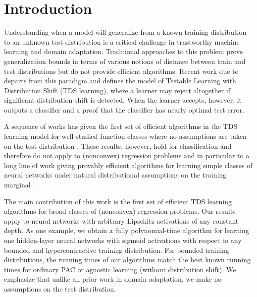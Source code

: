 \documentclass[11pt]{article} %
\numberwithin{equation}{section}
\begin{document}
\newpage
\section{Introduction}

Understanding when a model will generalize from a known training distribution to an unknown test distribution is a critical challenge in trustworthy machine learning and domain adaptation.  Traditional approaches to this problem prove generalization bounds in terms of various notions of distance between train and test distributions \cite{ben2006analysis,ben2010theory,mansour2009domadapt} but do not provide efficient algorithms.  Recent work due to \cite{klivans2023testable} departs from this paradigm and defines the model of Testable Learning with Distribution Shift (TDS learning), where a learner may reject altogether if significant distribution shift is detected.  When the learner accepts, however, it outputs a classifier and a proof that the classifier has nearly optimal test error.   

A sequence of works has given the first set of efficient algorithms in the TDS learning model for well-studied function classes where no assumptions are taken on the test distribution \cite{klivans2023testable,klivans2024learning,chandrasekaran2024efficient,goel2024tolerant}. These results, however, hold for classification and therefore do not apply to (nonconvex) regression problems and in particular to a long line of work giving provably efficient algorithms for learning simple classes of neural networks under natural distributional assumptions on the training marginal \cite{goel2019learning,diakonikolas2020approximation,diakonikolas2020algorithms,diakonikolas2022learning,chen2022learning,chen2023learning,wang2023robustly,gollakota2024agnostically,diakonikolas2024efficiently}.  




The main contribution of this work is the first set of efficient TDS learning algorithms for broad classes of (nonconvex) regression problems.  Our results apply to neural networks with arbitrary Lipschitz activations of any constant depth.  As one example, we obtain a fully polynomial-time algorithm for learning one hidden-layer neural networks with sigmoid activations with respect to any bounded and hypercontractive training distribution.  For bounded training distributions, the running times of our algorithms match the best known running times for ordinary PAC or agnostic learning (without distribution shift).  We emphasize that unlike all prior work in domain adaptation, we make no assumptions on the test distribution.  
\end{document}
